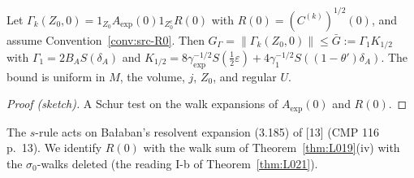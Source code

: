 \begin{lemma}\label{src:G3-GGAMMA}
Let $\Gamma_k(Z_0,0)=1_{Z_0}A_{\exp}(0)1_{Z_0^c}R(0)$ with $R(0)=(C^{(k)})^{1/2}(0)$, and assume Convention~\ref{conv:src-R0}. Then $G_\Gamma=\|\Gamma_k(Z_0,0)\|\le\bar G:=\Gamma_1K_{1/2}$ with $\Gamma_1=2B_AS(\delta_A)$ and $K_{1/2}=8\gamma_{\exp}^{-1/2}S(\tfrac12\varepsilon)+4\gamma_1^{-1/2}S((1-\theta')\delta_A)$. The bound is uniform in $M$, the volume, $j$, $Z_0$, and regular $U$.
\end{lemma}
\begin{proof}[Proof (sketch)]
A Schur test on the walk expansions of $A_{\exp}(0)$ and $R(0)$.
\end{proof}

\begin{convention}\label{conv:src-R0}
The $s$-rule acts on Ba{\l}aban's resolvent expansion (3.185) of [13] (CMP 116 p.~13). We identify $R(0)$ with the walk sum of Theorem~\ref{thm:L019}(iv) with the $\sigma_0$-walks deleted (the reading I-b of Theorem~\ref{thm:L021}).
\end{convention}

